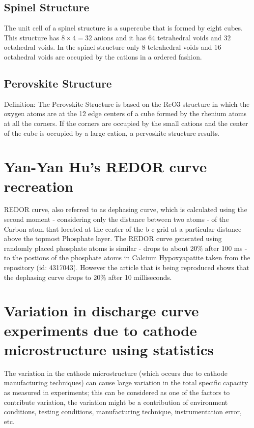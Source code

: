 \documentclass[12pt]{book}
\begin{document}
\subsection{Spinel Structure}

The unit cell of a spinel structure is a supercube that is formed
by eight cubes. This structure has $8\times4=32$ anions and it has
64 tetrahedral voids and 32 octahedral voids. In the spinel structure
only 8 tetrahedral voids and 16 octahedral voids are occupied by the
cations in a ordered fashion.

\subsection{Perovskite Structure}

Definition: The Perovskite Structure is based on the ReO3 structure
in which the oxygen atoms are at the 12 edge centers of a cube formed
by the rhenium atoms at all the corners. If the corners are occupied
by the small cations and the center of the cube is occupied by a large
cation, a pervoskite structure results.

\section{Yan-Yan Hu's REDOR curve recreation}

REDOR curve, also referred to as dephasing curve, which is calculated
using the second moment - considering only the distance between two
atoms - of the Carbon atom that located at the center of the b-c grid
at a particular distance above the topmost Phosphate layer. The REDOR
curve generated using randomly placed phosphate atoms is similar -
drops to about 20\% after 100 ms - to the postions of the phosphate
atoms in Calcium Hypoxyapatite taken from the repository (id: 4317043).
However the article that is being reproduced shows that the dephasing
curve drops to 20\% after 10 milliseconds.

\section{Variation in discharge curve experiments due to cathode microstructure
	using statistics}

The variation in the cathode microstructure (which occurs due to cathode
manufacturing techniques) can cause large variation in the total specific
capacity as measured in experiments; this can be considered as one
of the factors to contribute variation, the variation might be a contribution
of environment conditions, testing conditions, manufacturing technique,
instrumentation error, etc. 
\end{document}
